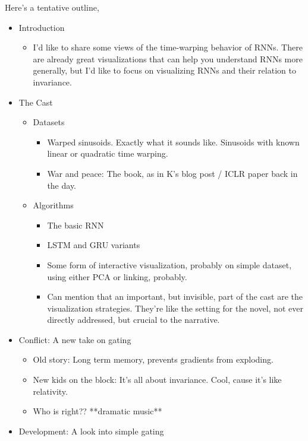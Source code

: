 \documentclass{article}
\begin{document}
Here's a tentative outline,

\begin{itemize}
\item Introduction
  \begin{itemize}
    \item I'd like to share some views of the time-warping behavior of RNNs.
      There are already great visualizations that can help you understand RNNs
      more generally, but I'd like to focus on visualizing RNNs and their
      relation to invariance.
  \end{itemize}
\item The Cast
  \begin{itemize}
  \item Datasets
    \begin{itemize}
    \item Warped sinusoids. Exactly what it sounds like. Sinusoids with known
      linear or quadratic time warping.
    \item War and peace: The book, as in K's blog post / ICLR paper back in the
      day.
    \end{itemize}
  \item Algorithms
    \begin{itemize}
    \item The basic RNN
    \item LSTM and GRU variants
    \item Some form of interactive visualization, probably on simple dataset,
      using either PCA or linking, probably.
    \item Can mention that an important, but invisible, part of the cast are the
      visualization strategies. They're like the setting for the novel, not ever
      directly addressed, but crucial to the narrative.
    \end{itemize}
  \end{itemize}
\item Conflict: A new take on gating
  \begin{itemize}
  \item Old story: Long term memory, prevents gradients from exploding.
  \item New kids on the block: It's all about invariance. Cool, cause it's like
    relativity.
  \item Who is right?? **dramatic music**
  \end{itemize}
\item Development: A look into simple gating
  \begin{itemize}

\end{itemize}
\end{itemize}
\end{document}
